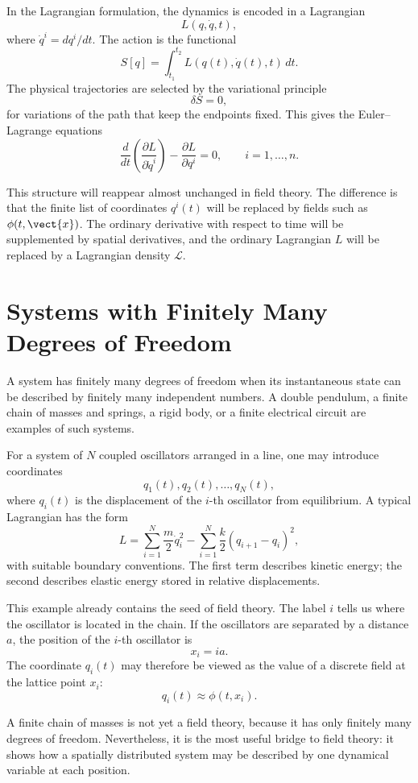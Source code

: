 In the Lagrangian formulation, the dynamics is encoded in a Lagrangian
\[
    L(q,\dot q,t),
\]
where \(\dot q^i=dq^i/dt\). The action is the functional
\[
    S[q] = \int_{t_1}^{t_2} L(q(t),\dot q(t),t)\,dt.
\]
The physical trajectories are selected by the variational principle
\[
    \delta S = 0,
\]
for variations of the path that keep the endpoints fixed. This gives the
Euler--Lagrange equations
\[
    \frac{d}{dt}\left(\frac{\partial L}{\partial \dot q^i}\right)
    - \frac{\partial L}{\partial q^i}=0,
    \qquad i=1,\ldots,n.
\]

This structure will reappear almost unchanged in field theory. The difference
is that the finite list of coordinates \(q^i(t)\) will be replaced by fields
such as \(\phi(t,\vect{x})\). The ordinary derivative with respect to time will
be supplemented by spatial derivatives, and the ordinary Lagrangian \(L\) will
be replaced by a Lagrangian density \(\mathcal{L}\).

\section{Systems with Finitely Many Degrees of Freedom}

A system has finitely many degrees of freedom when its instantaneous state can
be described by finitely many independent numbers. A double pendulum, a finite
chain of masses and springs, a rigid body, or a finite electrical circuit are
examples of such systems.

For a system of \(N\) coupled oscillators arranged in a line, one may introduce
coordinates
\[
    q_1(t),q_2(t),\ldots,q_N(t),
\]
where \(q_i(t)\) is the displacement of the \(i\)-th oscillator from equilibrium.
A typical Lagrangian has the form
\[
    L = \sum_{i=1}^{N} \frac{m}{2}\dot q_i^2
        - \sum_{i=1}^{N} \frac{k}{2}(q_{i+1}-q_i)^2,
\]
with suitable boundary conventions. The first term describes kinetic energy;
the second describes elastic energy stored in relative displacements.

This example already contains the seed of field theory. The label \(i\) tells us
where the oscillator is located in the chain. If the oscillators are separated
by a distance \(a\), the position of the \(i\)-th oscillator is
\[
    x_i = i a.
\]
The coordinate \(q_i(t)\) may therefore be viewed as the value of a discrete
field at the lattice point \(x_i\):
\[
    q_i(t) \approx \phi(t,x_i).
\]

\begin{examplebox}
A finite chain of masses is not yet a field theory, because it has only
finitely many degrees of freedom. Nevertheless, it is the most useful bridge to
field theory: it shows how a spatially distributed system may be described by
one dynamical variable at each position.
\end{examplebox}

